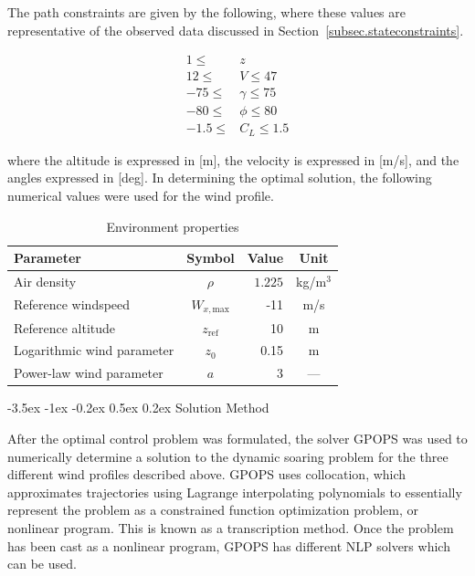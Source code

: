 \documentclass[11pt,letterpaper,onecolumn]{article}
\makeatletter
\renewcommand\subsection{\@startsection{subsection}{1}{\z@}%
 {-3.5ex \@plus-1ex \@minus-0.2ex}%
 {0.5ex \@plus0.2ex}%
 {\fontsize{10pt}{10pt}\selectfont\bfseries\sffamily}}
\makeatother
\begin{document}
The path constraints are given by the following, where these values are representative of the observed data discussed in Section~\ref{subsec.stateconstraints}.

\begin{equation*}
  \begin{split}
    1\leq     & z \\
    12\leq    & V\leq47 \\
    -75\leq   & \gamma\leq75 \\
    -80\leq   & \phi\leq80 \\
    -1.5\leq  & C_{L}\leq1.5
  \end{split}
\end{equation*}

where the altitude is expressed in [m], the velocity is expressed in [m/s], and the angles expressed in [deg].
In determining the optimal solution, the following numerical values were used for the wind profile.

\begin{table}[H]
  \centering
  \caption{Environment properties}
  \begin{tabular}{lcrc}
    \toprule
    Parameter                   & Symbol              & Value   & Unit \\ \midrule
    Air density                 & $\rho$              & $1.225$ & kg/m$^{3}$ \\
    Reference windspeed         & $W_{x,\text{max}}$  & -11     & m/s \\
    Reference altitude          & $z_{\text{ref}}$    & 10      & m \\
    Logarithmic wind parameter  & $z_{0}$             & 0.15    & m \\
    Power-law wind parameter    & $a$                 & 3       & --- \\
    \bottomrule
  \end{tabular}\label{tab.environmentdata}
\end{table}

\subsection{Solution Method}

After the optimal control problem was formulated, the solver GPOPS was used to numerically determine a solution to the dynamic soaring problem for the three different wind profiles described above.
GPOPS uses collocation, which approximates trajectories using Lagrange interpolating polynomials to essentially represent the problem as a constrained function optimization problem, or nonlinear program.
This is known as a transcription method.
Once the problem has been cast as a nonlinear program, GPOPS has different NLP solvers which can be used.
\end{document}
